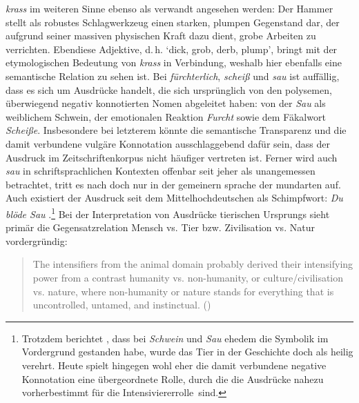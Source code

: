 \textit{krass} im weiteren Sinne ebenso als verwandt angesehen werden: Der Hammer stellt als robustes Schlagwerkzeug einen starken, plumpen Gegenstand dar, der aufgrund seiner massiven physischen Kraft dazu dient, grobe Arbeiten zu verrichten. Ebendiese Adjektive, d.\,h. `dick, grob, derb, plump', bringt \citet[727]{Pfeifer.1995} mit der etymologischen Bedeutung von \textit{krass} in Verbindung, weshalb hier ebenfalls eine semantische Relation zu sehen ist. Bei \textit{fürchterlich}, \textit{scheiß} und \textit{sau} ist auffällig, dass es sich um Ausdrücke handelt, die sich ursprünglich von den polysemen, überwiegend negativ konnotierten Nomen abgeleitet haben: von der \textit{Sau} als weiblichem Schwein, der emotionalen Reaktion \textit{Furcht} sowie dem Fäkalwort \textit{Scheiße}. Insbesondere bei letzterem könnte die semantische Transparenz und die damit verbundene vulgäre Konnotation ausschlaggebend dafür sein, dass der Ausdruck im Zeitschriftenkorpus nicht häufiger vertreten ist. Ferner wird auch \textit{sau} in schriftsprachlichen Kontexten offenbar seit jeher als unangemessen betrachtet, tritt es nach \mbox{\citet[122]{Tobler.1868}} doch \glqq{}nur in der gemeinern sprache der mundarten\grqq{} auf. Auch existiert der Ausdruck seit dem Mittelhochdeutschen als Schimpfwort: \textit{Du blöde Sau} \mbox{\citep[vgl.][1168]{Pfeifer.1995}}.\footnote{Trotzdem berichtet \citet[270]{Becher.1907}, dass bei \textit{Schwein} und \textit{Sau} ehedem die Symbolik im Vordergrund gestanden habe, wurde das Tier in der Geschichte doch als heilig verehrt. Heute spielt hingegen wohl eher die damit verbundene negative Konnotation eine übergeordnete Rolle, durch die die Ausdrücke nahezu vorherbestimmt für die \mbox{Intensiviererrolle sind}.} Bei der Interpretation von Ausdrücke tierischen Ursprungs sieht \mbox{\citet[]{Claudi.2006}} primär die Gegensatzrelation Mensch vs. Tier bzw. Zivilisation vs. Natur vordergründig:

\begin{singlespace*}
\begin{quotation}
\noindent The intensifiers from the animal domain probably derived their intensifying power from a contrast humanity vs. non-humanity, or culture/civilisation vs. nature, where non-humanity or nature stands for everything that is uncontrolled, untamed, and instinctual. \hfill (\citealt[360]{Claudi.2006}) \\ \end{quotation}
\end{singlespace*}

